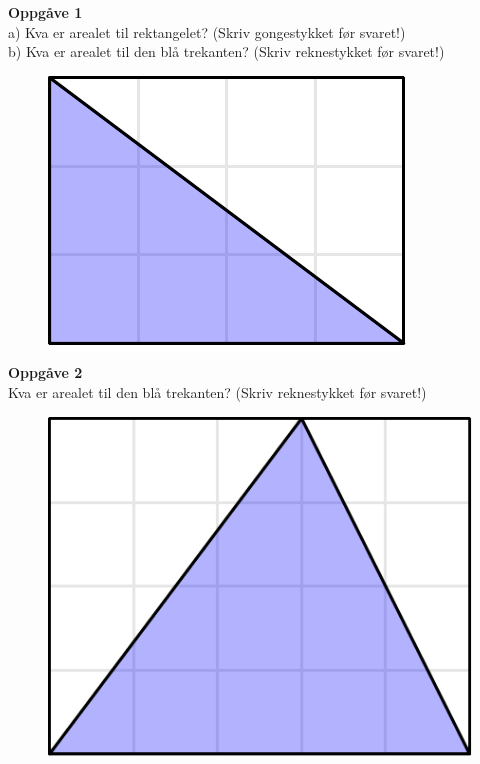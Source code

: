 

\geometry{verbose,a4paper, inner=2cm, outer=1 cm, bmargin=2cm, tmargin=1cm}

\renewcommand*\familydefault{\sfdefault} 


\Large
\textbf{Oppgåve 1} \\
a) Kva er arealet til rektangelet? (Skriv gongestykket før svaret!)\\
b) Kva er arealet til den blå trekanten? (Skriv reknestykket før svaret!)
\begin{figure}
	\centering
	\includegraphics[]{artrknt1}
\end{figure}

\textbf{Oppgåve 2}\\
Kva er arealet til den blå trekanten? (Skriv reknestykket før svaret!)
\begin{figure}
	\centering
	\includegraphics[]{artrknt2}
\end{figure}

